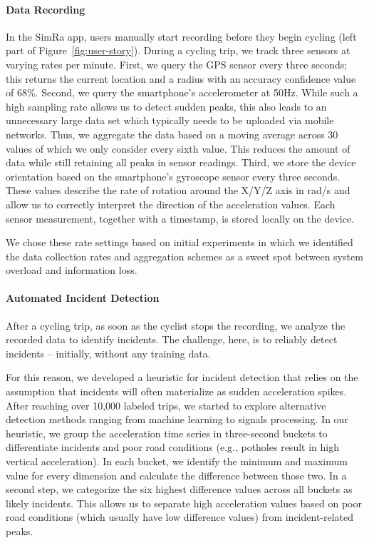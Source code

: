 \paragraph{Data Recording}
In the SimRa app, users manually start recording before they begin cycling (left part of Figure~\ref{fig:user-story}).
During a cycling trip, we track three sensors at varying rates per minute.
First, we query the GPS sensor every three seconds; this returns the current location and a radius with an accuracy confidence value of 68\%.
Second, we query the smartphone's accelerometer at 50Hz.
While such a high sampling rate allows us to detect sudden peaks, this also leads to an unnecessary large data set which typically needs to be uploaded via mobile networks.
Thus, we aggregate the data based on a moving average across 30 values of which we only consider every sixth value.
This reduces the amount of data while still retaining all peaks in sensor readings.
Third, we store the device orientation based on the smartphone's gyroscope sensor every three seconds.
These values describe the rate of rotation around the X/Y/Z axis in rad/s and allow us to correctly interpret the direction of the acceleration values.
Each sensor measurement, together with a timestamp, is stored locally on the device.

We chose these rate settings based on initial experiments in which we identified the data collection rates and aggregation schemes as a sweet spot between system overload and information loss.



\paragraph{Automated Incident Detection}
After a cycling trip, as soon as the cyclist stops the recording, we analyze the recorded data to identify incidents.
The challenge, here, is to reliably detect incidents -- initially, without any training data.

For this reason, we developed a heuristic for incident detection that relies on the assumption that incidents will often materialize as sudden acceleration spikes.
After reaching over 10,000 labeled trips, we started to explore alternative detection methods ranging from machine learning to signals processing.
In our heuristic, we group the acceleration time series in three-second buckets to differentiate incidents and poor road conditions (e.g., potholes result in high vertical acceleration).
In each bucket, we identify the minimum and maximum value for every dimension and calculate the difference between those two.
In a second step, we categorize the six highest difference values across all buckets as likely incidents.
This allows us to separate high acceleration values based on poor road conditions (which usually have low difference values) from incident-related peaks.

